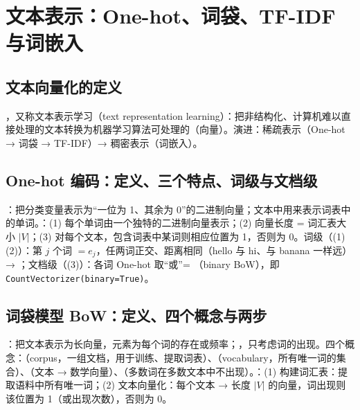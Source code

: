 \section{文本表示：One-hot、词袋、TF-IDF 与词嵌入}

\subsection{文本向量化的定义}
，又称文本表示学习（text representation learning）：把非结构化、计算机难以直接处理的文本转换为机器学习算法可处理的（向量）。演进：稀疏表示（One-hot → 词袋 → TF-IDF）→ 稠密表示（词嵌入）。

\subsection{One-hot 编码：定义、三个特点、词级与文档级}
：把分类变量表示为“一位为 1、其余为 0”的二进制向量；文本中用来表示词表中的单词。：(1) 每个单词由一个独特的二进制向量表示；(2) 向量长度 = 词汇表大小 $|V|$；(3) 对每个文本，包含词表中某词则相应位置为 1，否则为 0。词级（(1)(2)）：第 $j$ 个词 $=e_j$，任两词正交、距离相同（hello 与 hi、与 banana 一样远）→ ；文档级（(3)）：各词 One-hot 取“或”= （binary BoW），即 \texttt{CountVectorizer(binary=True)}。

\subsection{词袋模型 BoW：定义、四个概念与两步}
：把文本表示为长向量，元素为每个词的存在或频率；，只考虑词的出现。四个概念：（corpus，一组文档，用于训练、提取词表）、（vocabulary，所有唯一词的集合）、（文本 → 数学向量）、（多数词在多数文本中不出现）。：(1) 构建词汇表：提取语料中所有唯一词；(2) 文本向量化：每个文本 → 长度 $|V|$ 的向量，词出现则该位置为 1（或出现次数），否则为 0。

